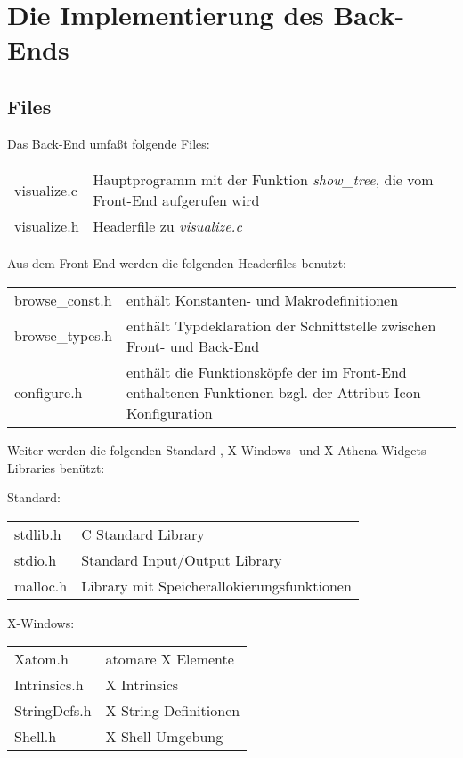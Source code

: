 \section{Die Implementierung des Back-Ends}

\subsection{Files}

Das Back-End umfa\ss{}t folgende Files:

\bigskip
\begin{tabular}{|l|p{10.4cm}|}
\hline
visualize.c  &   Hauptprogramm mit der Funktion {\it show\_tree}, die vom Front-End aufgerufen wird   \\
visualize.h  &   Headerfile zu {\it visualize.c}                                                   \\
\hline
\end{tabular}
\bigskip

Aus dem Front-End werden die folgenden Headerfiles benutzt:

\bigskip
\begin{tabular}{|l|p{9.6cm}|}
\hline
browse\_const.h & enth\"alt Konstanten- und Makrodefinitionen   \\
browse\_types.h & enth\"alt Typdeklaration der Schnittstelle zwischen Front- und Back-End     \\
configure.h     & enth\"alt die Funktionsk\"opfe der im Front-End enthaltenen Funktionen bzgl. der Attribut-Icon-Konfiguration \\
\hline
\end{tabular}
\bigskip

Weiter werden die folgenden Standard-, X-Windows- und X-Athena-Widgets-Libraries ben\"utzt:

Standard:

\bigskip
\begin{tabular}{|l|l|}
\hline
stdlib.h   &     C Standard Library   \\
stdio.h    &     Standard Input/Output Library   \\
malloc.h   &     Library mit Speicherallokierungsfunktionen \\
\hline
\end{tabular}
\bigskip

X-Windows:

\bigskip
\begin{tabular}{|l|l|}
\hline
Xatom.h       &  atomare X Elemente    \\
Intrinsics.h  &  X Intrinsics      \\
StringDefs.h  &  X String Definitionen \\
Shell.h       &  X Shell Umgebung    \\
\hline
\end{tabular}
\bigskip

